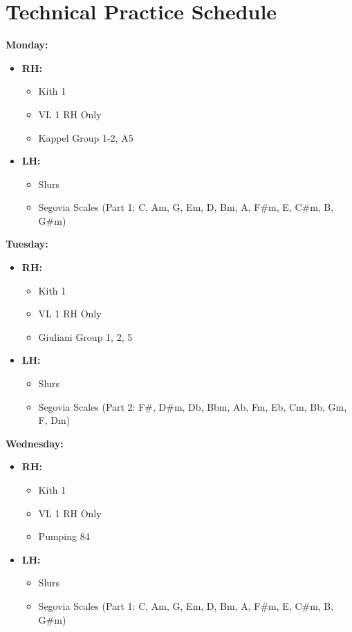 \documentclass{article}
\begin{document}
\section*{Technical Practice Schedule}

\textbf{Monday:}
\begin{itemize}
    \item \textbf{RH:}
    \begin{itemize}
        \item Kith 1
        \item VL 1 RH Only
        \item Kappel Group 1-2, A5
    \end{itemize}
    \item \textbf{LH:}
    \begin{itemize}
        \item Slurs
        \item Segovia Scales (Part 1: C, Am, G, Em, D, Bm, A, F\#m, E, C\#m, B, G\#m)
    \end{itemize}
\end{itemize}

\textbf{Tuesday:}
\begin{itemize}
    \item \textbf{RH:}
    \begin{itemize}
        \item Kith 1
        \item VL 1 RH Only
        \item Giuliani Group 1, 2, 5
    \end{itemize}
    \item \textbf{LH:}
    \begin{itemize}
        \item Slurs
        \item Segovia Scales (Part 2: F\#, D\#m, Db, Bbm, Ab, Fm, Eb, Cm, Bb, Gm, F, Dm)
    \end{itemize}
\end{itemize}

\textbf{Wednesday:}
\begin{itemize}
    \item \textbf{RH:}
    \begin{itemize}
        \item Kith 1
        \item VL 1 RH Only
        \item Pumping 84
    \end{itemize}
    \item \textbf{LH:}
    \begin{itemize}
        \item Slurs
        \item Segovia Scales (Part 1: C, Am, G, Em, D, Bm, A, F\#m, E, C\#m, B, G\#m)
    \end{itemize}
\end{itemize}
\end{document}
